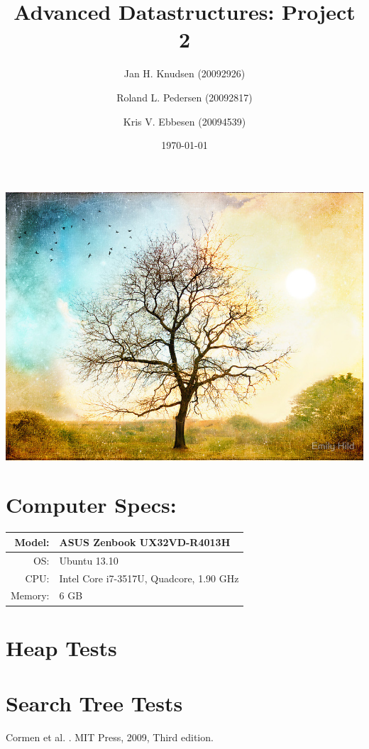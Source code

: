 \documentclass[a4paper, 12pt]{article}
\title{Advanced Datastructures: Project 2}
\date{\today}
\author{Jan H. Knudsen (20092926)
\and
Roland L. Pedersen (20092817)
\and
Kris V. Ebbesen (20094539)
}
\begin{document}
\maketitle
\includegraphics[width=\textwidth]{graphs/flat,800x800,070,f.jpg}
\newpage
\tableofcontents
\newpage





\section{Computer Specs:}
\begin{tabular}{| r  l |} \hline
Model: &  ASUS Zenbook UX32VD-R4013H \\ \hline
OS: & Ubuntu 13.10 \\ \hline
CPU: & Intel Core i7-3517U, Quadcore, 1.90 GHz \\ \hline
Memory: & 6 GB\\ \hline
\end{tabular}

\section{Heap Tests}


\section{Search Tree Tests}




\begin{thebibliography}{9}

Cormen et al.
.
\newblock MIT Press, 2009, Third edition.

\end{thebibliography}
\end{document}
